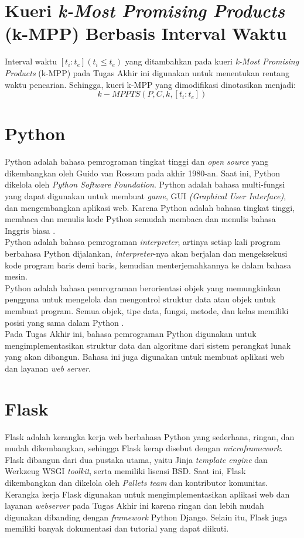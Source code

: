 \section{Kueri \textit{k-Most Promising Products} (k-MPP) Berbasis Interval Waktu}
\tab Interval waktu $[t_i:t_e ](t_i \leq t_e)$ yang ditambahkan pada kueri \textit{k-Most Promising Products} (k-MPP) pada Tugas Akhir ini digunakan untuk menentukan rentang waktu pencarian. Sehingga, kueri k-MPP yang dimodifikasi dinotasikan menjadi:
\begin{equation}\label{eq:kmppts}
k-MPPTS(P, C, k, [t_i:t_e])
\end{equation} 

\section{Python}
\tab Python adalah bahasa pemrograman tingkat tinggi dan \textit{open source} yang dikembangkan oleh Guido van Rossum pada akhir 1980-an. Saat ini, Python dikelola oleh \textit{Python Software Foundation}. Python adalah bahasa multi-fungsi yang dapat digunakan untuk membuat \textit{game}, GUI \textit{(Graphical User Interface)}, dan mengembangkan aplikasi web. Karena Python adalah bahasa tingkat tinggi, membaca dan menulis kode Python semudah membaca dan menulis bahasa Inggris biasa \cite{python}.\\
\tab Python adalah bahasa pemrograman \textit{interpreter}, artinya setiap kali program berbahasa Python dijalankan, \textit{interpreter}-nya akan berjalan dan mengeksekusi kode program baris demi baris, kemudian menterjemahkannya ke dalam bahasa mesin.\\
\tab Python adalah bahasa pemrograman berorientasi objek yang memungkinkan pengguna untuk mengelola dan mengontrol struktur data atau objek untuk membuat program. Semua objek, tipe data, fungsi, metode, dan kelas memiliki posisi yang sama dalam Python \cite{python}.\\
\tab Pada Tugas Akhir ini, bahasa pemrograman Python digunakan untuk mengimplementasikan struktur data dan algoritme dari sistem perangkat lunak yang akan dibangun. Bahasa ini juga digunakan untuk membuat aplikasi web dan layanan \textit{web server}. 

\section{Flask}
\tab Flask adalah kerangka kerja web berbahasa Python yang sederhana, ringan, dan mudah dikembangkan, sehingga Flask kerap disebut dengan \textit{microframework}. Flask dibangun dari dua pustaka utama, yaitu Jinja \textit{template engine} dan Werkzeug WSGI \textit{toolkit}, serta memiliki lisensi BSD. Saat ini, Flask dikembangkan dan dikelola oleh \textit{Pallets team} dan kontributor komunitas. \\
\tab Kerangka kerja Flask digunakan untuk mengimplementasikan aplikasi web dan layanan \textit{webserver} pada Tugas Akhir ini karena ringan dan lebih mudah digunakan dibanding dengan \textit{framework} Python Django. Selain itu, Flask juga memiliki banyak dokumentasi dan tutorial yang dapat diikuti.